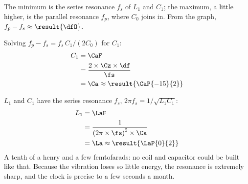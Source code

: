 \begin{abcliste}
\abc The minimum is the series resonance $f_s$ of $L_1$ and $C_1$; the maximum, a little higher, is the parallel resonance $f_p$, where $C_0$ joins in. From the graph, $f_p - f_s \approx \result{\dfO}$.

\abc Solving $f_p - f_s = f_s\,C_1/(2C_0)$ for $C_1$:
\begin{align}
 C_1 &= \CaF \\
   &= \frac{2\times\Cz\times\df}{\fs} \\
   &= \Ca \approx \result{\CaP{-15}{2}}
\end{align}

\abc $L_1$ and $C_1$ have the series resonance $f_s$, $2\pi f_s = 1/\sqrt{L_1 C_1}$:
\begin{align}
 L_1 &= \LaF \\
   &= \frac{1}{\left(2\pi\times\fs\right)^2\times\Ca} \\
   &= \La \approx \result{\LaP{0}{2}}
\end{align}
A tenth of a henry and a few femtofarads: no coil and capacitor could be built like that. Because the vibration loses so little energy, the resonance is extremely sharp, and the clock is precise to a few seconds a month.
\end{abcliste}
